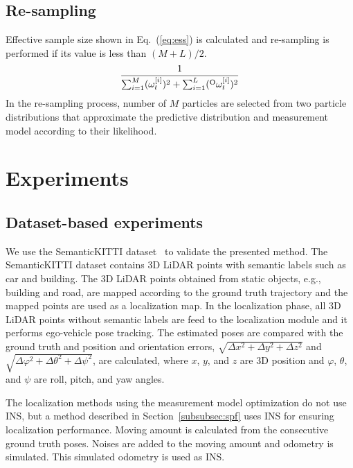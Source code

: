 \documentclass[letterpaper, 10 pt, conference]{ieeeconf}  %
\begin{document}
\subsection{Re-sampling}

Effective sample size shown in Eq.~(\ref{eq:ess}) is calculated and re-sampling is performed if its value is less than $(M + L) / 2$.
%
\begin{align}
    \frac{1}{\sum_{i=1}^{M} (\omega_{t}^{[i]})^{2} + \sum_{i=1}^{L} ({}^{\rm O}\omega_{t}^{[i]})^{2}}
    \label{eq:ess}
\end{align}
%
In the re-sampling process, number of $M$ particles are selected from two particle distributions that approximate the predictive distribution and measurement model according to their likelihood.













\section{Experiments}
\label{sec:experiments}

\subsection{Dataset-based experiments}

We use the SemanticKITTI dataset~\cite{behley2019iccv} to validate the presented method.
The SemanticKITTI dataset contains 3D LiDAR points with semantic labels such as car and building.
The 3D LiDAR points obtained from static objects, e.g., building and road, are mapped according to the ground truth trajectory and the mapped points are used as a localization map.
In the localization phase, all 3D LiDAR points without semantic labels are feed to the localization module and it performs ego-vehicle pose tracking.
The estimated poses are compared with the ground truth and position and orientation errors, $\sqrt{\Delta x^{2} + \Delta y^{2} + \Delta z^{2}}$ and $\sqrt{\Delta \varphi^{2} + \Delta \theta^{2} + \Delta \psi^{2}}$, are calculated, where $x$, $y$, and $z$ are 3D position and $\varphi$, $\theta$, and $\psi$ are roll, pitch, and yaw angles.

The localization methods using the measurement model optimization do not use INS, but a method described in Section~\ref{subsubsec:spf} uses INS for ensuring localization performance.
Moving amount is calculated from the consecutive ground truth poses.
Noises are added to the moving amount and odometry is simulated.
This simulated odometry is used as INS.
\end{document}
